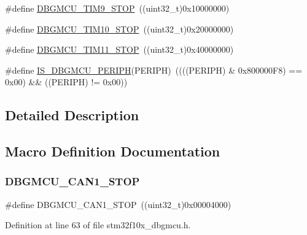 \begin{DoxyCompactItemize}
\item 
\#define \hyperlink{group___d_b_g_m_c_u___exported___constants_ga560c557a0d0839dba04f7f2b47851109}{D\+B\+G\+M\+C\+U\+\_\+\+T\+I\+M9\+\_\+\+S\+T\+OP}~((uint32\+\_\+t)0x10000000)
\item 
\#define \hyperlink{group___d_b_g_m_c_u___exported___constants_ga1f0ae2f78e1f9d7eb819bf49b13b5327}{D\+B\+G\+M\+C\+U\+\_\+\+T\+I\+M10\+\_\+\+S\+T\+OP}~((uint32\+\_\+t)0x20000000)
\item 
\#define \hyperlink{group___d_b_g_m_c_u___exported___constants_gade03e5368c3bf8a2f43fc046f1d87f30}{D\+B\+G\+M\+C\+U\+\_\+\+T\+I\+M11\+\_\+\+S\+T\+OP}~((uint32\+\_\+t)0x40000000)
\item 
\#define \hyperlink{group___d_b_g_m_c_u___exported___constants_ga96d44dc7861b6a3f364942704f323a45}{I\+S\+\_\+\+D\+B\+G\+M\+C\+U\+\_\+\+P\+E\+R\+I\+PH}(P\+E\+R\+I\+PH)~((((P\+E\+R\+I\+PH) \& 0x800000\+F8) == 0x00) \&\& ((\+P\+E\+R\+I\+P\+H) != 0x00))
\end{DoxyCompactItemize}


\subsection{Detailed Description}


\subsection{Macro Definition Documentation}
\mbox{\label{group___d_b_g_m_c_u___exported___constants_ga5ef70e050d1a95f350b6585336a55ca8}} 
\subsubsection{\texorpdfstring{D\+B\+G\+M\+C\+U\+\_\+\+C\+A\+N1\+\_\+\+S\+T\+OP}{DBGMCU\_CAN1\_STOP}}
{\footnotesize\ttfamily \#define D\+B\+G\+M\+C\+U\+\_\+\+C\+A\+N1\+\_\+\+S\+T\+OP~((uint32\+\_\+t)0x00004000)}



Definition at line 63 of file stm32f10x\+\_\+dbgmcu.\+h.

